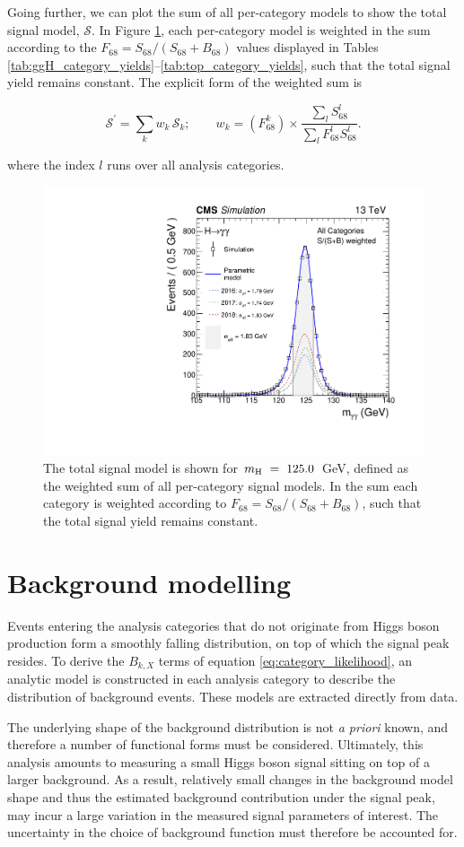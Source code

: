 Going further, we can plot the sum of all per-category models to show the total signal model, $\mathcal{S}$. In Figure \ref{fig:sigmodels_weighted}, each per-category model is weighted in the sum according to the $F_{68} = S_{68}/(S_{68}+B_{68})$ values displayed in Tables \ref{tab:ggH_category_yields}--\ref{tab:top_category_yields}, such that the total signal yield remains constant. The explicit form of the weighted sum is

\begin{equation}\label{eq:sigmodel_wsum}
    \mathcal{S}^' = \sum_k w_k\,\mathcal{S}_k; \qquad w_k = (F^k_{68}) \times \frac{\sum_l S^l_{68}}{\sum_l F^l_{68} S^l_{68}}.
\end{equation}

\noindent
where the index $l$ runs over all analysis categories.

\begin{figure}
  \centering
  \includegraphics[width=.45\textwidth]{Figures/hgg_stats/smodel_all_weight.pdf}
  \caption[Weighted sum of all signal models]
  {
    The total signal model is shown for $m_{\rm{H}}~=~125.0$~GeV, defined as the weighted sum of all per-category signal models. In the sum each category is weighted according to $F_{68}=S_{68}/(S_{68}+B_{68})$, such that the total signal yield remains constant.
  }
  \label{fig:sigmodels_weighted}
\end{figure}

\section{Background modelling}\label{sec:bkg_modeling}
Events entering the analysis categories that do not originate from Higgs boson production form a smoothly falling \mgg distribution, on top of which the signal peak resides. To derive the $B_{k,X}$ terms of equation \ref{eq:category_likelihood}, an analytic model is constructed in each analysis category to describe the distribution of background events. These models are extracted directly from data.

The underlying shape of the background distribution is not \textit{a priori} known, and therefore a number of functional forms must be considered. Ultimately, this analysis amounts to measuring a small Higgs boson signal sitting on top of a larger background. As a result, relatively small changes in the background model shape and thus the estimated background contribution under the signal peak, may incur a large variation in the measured signal parameters of interest. The uncertainty in the choice of background function must therefore be accounted for.

